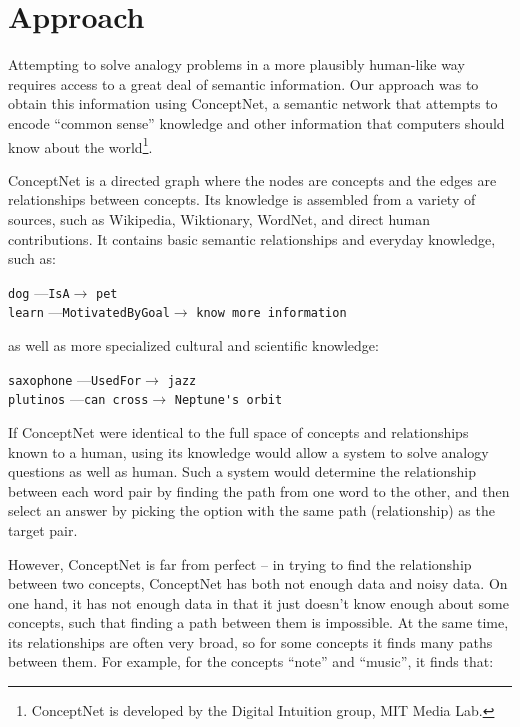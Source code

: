 \documentclass[11pt]{article}
\begin{document}


\section{Approach}

Attempting to solve analogy problems in a more plausibly human-like way requires access to a great deal of semantic information. Our approach was to obtain this information using ConceptNet, a semantic network that attempts to encode ``common sense'' knowledge and other information that computers should know about the world\footnote{ConceptNet is developed by the Digital Intuition group, MIT Media Lab.}.

ConceptNet is a directed graph where the nodes are concepts and the edges are relationships between concepts. Its knowledge is assembled from a variety of sources, such as Wikipedia, Wiktionary, WordNet, and direct human contributions. It contains basic semantic relationships and everyday knowledge, such as:

\verb|dog| ---\verb|IsA|$\rightarrow$ \verb|pet|\\
\verb|learn| ---\verb|MotivatedByGoal|$\rightarrow$ \verb|know more information|

as well as more specialized cultural and scientific knowledge:

\verb|saxophone| ---\verb|UsedFor|$\rightarrow$ \verb|jazz|\\
\verb|plutinos| ---\verb|can cross|$\rightarrow$ \verb|Neptune's orbit|

If ConceptNet were identical to the full space of concepts and relationships known to a human, using its knowledge would allow a system to solve analogy questions as well as human. Such a system would determine the relationship between each word pair by finding the path from one word to the other, and then select an answer by picking the option with the same path (relationship) as the target pair.

However, ConceptNet is far from perfect -- in trying to find the relationship between two concepts, ConceptNet has both not enough data and noisy data. On one hand, it has not enough data in that it just doesn't know enough about some concepts, such that finding a path between them is impossible. At the same time, its relationships are often very broad, so for some concepts it finds many paths between them. For example, for the concepts ``note'' and ``music'', it finds that:
\end{document}
